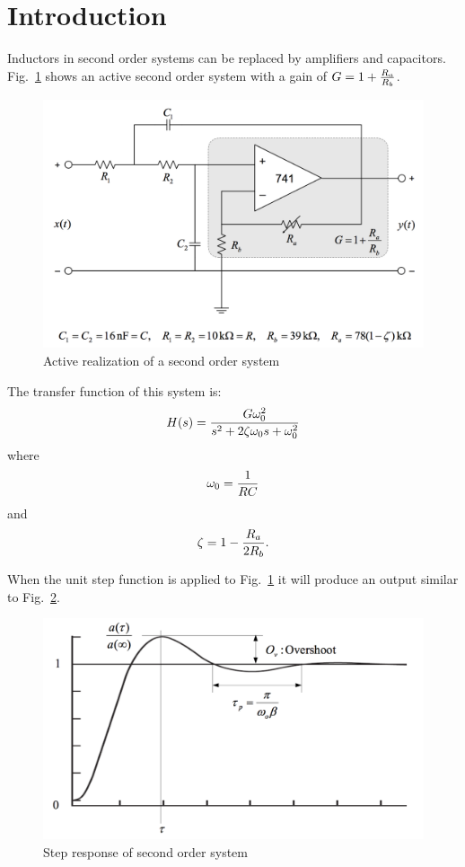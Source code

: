 \section{Introduction}\label{sec:intro}
Inductors in second order systems can be replaced by amplifiers and capacitors.
Fig.~\ref{fig:schematic} shows an active second order system with a gain of $G = 1 + {R_a \over R_b}$.

\begin{figure}[tbph]
	\centering
	\includegraphics[width=0.7\linewidth]{graphics/schematic}
	\caption{Active realization of a second order system}
	\label{fig:schematic}
\end{figure}

The transfer function of this system is:
\begin{equation}\label{eqn:tf}
	H(s) = { G \omega_0^2 \over s^2 + 2\zeta\omega_0 s + \omega_0^2 }
\end{equation}
where 
\begin{equation}\label{eqn:freq}
	\omega_0 = {1 \over RC}
\end{equation}and
\begin{equation}\label{eqn:damping}
	\zeta = 1 - {R_a \over 2R_b}.
\end{equation}

When the unit step function is applied to Fig.~\ref{fig:schematic} it will produce an output similar to Fig.~\ref{fig:overshoot_expected}.

\begin{figure}[tbph]
	\centering
	\includegraphics[width=0.7\linewidth]{graphics/overshoot_expected}
	\caption{Step response of second order system}
	\label{fig:overshoot_expected}
\end{figure}

